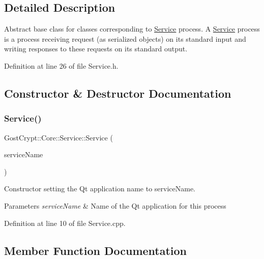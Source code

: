 \subsection{Detailed Description}
Abstract base class for classes corresponding to \hyperlink{class_gost_crypt_1_1_core_1_1_service}{Service} process. A \hyperlink{class_gost_crypt_1_1_core_1_1_service}{Service} process is a process receiving request (as serialized objects) on its standard input and writing responses to these requests on its standard output. 

Definition at line 26 of file Service.\+h.



\subsection{Constructor \& Destructor Documentation}
\mbox{\label{class_gost_crypt_1_1_core_1_1_service_ab1c98ecee7d34e60a3bd2518a26f5728}} 
\subsubsection{\texorpdfstring{Service()}{Service()}}
{\footnotesize\ttfamily Gost\+Crypt\+::\+Core\+::\+Service\+::\+Service (\begin{DoxyParamCaption}\item[{Q\+String}]{service\+Name }\end{DoxyParamCaption})\hspace{0.3cm}{\ttfamily [explicit]}}



Constructor setting the Qt application name to service\+Name. 


\begin{DoxyParams}{Parameters}
{\em service\+Name} & Name of the Qt application for this process \\
\hline
\end{DoxyParams}


Definition at line 10 of file Service.\+cpp.



\subsection{Member Function Documentation}
\mbox{\label{class_gost_crypt_1_1_core_1_1_service_acfca1e2dd3f0444b5c1f3a8e22c65db2}} 
